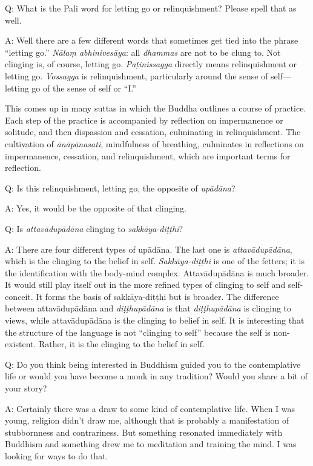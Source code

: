 \qaspace
Q: What is the Pali word for letting go or relinquishment? Please spell
that as well.

\qaspace
A: Well there are a few different words that sometimes get tied into the
phrase “letting go.” \emph{Nālaṃ abhinivesāya}: all \emph{dhammas} are
not to be clung to. Not clinging is, of course, letting go.
\emph{Paṭinissagga} directly means relinquishment or letting go.
\emph{Vossagga} is relinquishment, particularly around the sense of
self—letting go of the sense of self or “I.”

This comes up in many suttas in which the Buddha outlines a course of
practice. Each step of the practice is accompanied by reflection on
impermanence or solitude, and then dispassion and cessation, culminating
in relinquishment. The cultivation of \emph{ānāpānasati}, mindfulness of
breathing, culminates in reflections on impermanence, cessation, and
relinquishment, which are important terms for reflection.

\qaspace
Q: Is this relinquishment, letting go, the opposite of \emph{upādāna}?

\qaspace
A: Yes, it would be the opposite of that clinging.

\qaspace
Q: Is \emph{attavādupādāna} clinging to \emph{sakkāya-diṭṭhi}?

\qaspace
A: There are four different types of upādāna. The last one is
\emph{attavādupādāna}, which is the clinging to the belief in self.
\emph{Sakkāya-diṭṭhi} is one of the fetters; it is the identification
with the body-mind complex. Attavādupādāna is much broader. It would
still play itself out in the more refined types of clinging to self and
self-conceit. It forms the basis of sakkāya-diṭṭhi but is broader. The
difference between attavādupādāna and \emph{diṭṭhupādāna} is that
\emph{diṭṭhupādāna} is clinging to views, while attavādupādāna is the
clinging to belief in self. It is interesting that the structure of the
language is not “clinging to self” because the self is non-existent.
Rather, it is the clinging to the belief in self.

\qaspace
Q: Do you think being interested in Buddhism guided you to the
contemplative life or would you have become a monk in any tradition?
Would you share a bit of your story?

\qaspace
A: Certainly there was a draw to some kind of contemplative life. When I
was young, religion didn’t draw me, although that is probably a
manifestation of stubbornness and contrariness. But something resonated
immediately with Buddhism and something drew me to meditation and
training the mind. I was looking for ways to do that.

